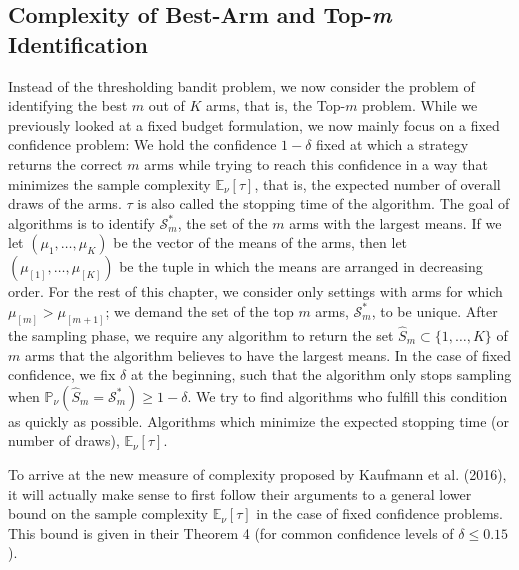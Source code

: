 \documentclass[12pt,]{article}
\begin{document}
\subsection{\texorpdfstring{Complexity of Best-Arm and Top-\emph{m}
Identification}{Complexity of Best-Arm and Top-m Identification}}\label{complexity-of-best-arm-and-top-m-identification}

Instead of the thresholding bandit problem, we now consider the problem
of identifying the best \(m\) out of \(K\) arms, that is, the Top-\(m\)
problem. While we previously looked at a fixed budget formulation, we
now mainly focus on a fixed confidence problem: We hold the confidence
\(1-\delta\) fixed at which a strategy returns the correct \(m\) arms
while trying to reach this confidence in a way that minimizes the sample
complexity \(\mathbb{E}_{\nu}[\tau]\), that is, the expected number of
overall draws of the arms. \(\tau\) is also called the stopping time of
the algorithm. The goal of algorithms is to identify
\(\mathcal{S}_m^*\), the set of the \(m\) arms with the largest means.
If we let \((\mu_1, \dots, \mu_K)\) be the vector of the means of the
arms, then let \((\mu_{[1]}, \dots, \mu_{[K]})\) be the tuple in which
the means are arranged in decreasing order. For the rest of this
chapter, we consider only settings with arms for which
\(\mu_{[m]} > \mu_{[m+1]}\); we demand the set of the top \(m\) arms,
\(\mathcal{S}_m^*\), to be unique. After the sampling phase, we require
any algorithm to return the set \(\hat{S}_m \subset \{1,\dots,K\}\) of
\(m\) arms that the algorithm believes to have the largest means. In the
case of fixed confidence, we fix \(\delta\) at the beginning, such that
the algorithm only stops sampling when
\(\mathbb{P}_{\nu}(\hat{S}_m = \mathcal{S}_m^*) \geq 1-\delta\). We try
to find algorithms who fulfill this condition as quickly as possible.
Algorithms which minimize the expected stopping time (or number of
draws), \(\mathbb{E}_{\nu}[\tau]\).

To arrive at the new measure of complexity proposed by Kaufmann et al.
(2016), it will actually make sense to first follow their arguments to a
general lower bound on the sample complexity \(\mathbb{E}_{\nu}[\tau]\)
in the case of fixed confidence problems. This bound is given in their
Theorem 4 (for common confidence levels of \(\delta \leq 0.15\)).
\end{document}
